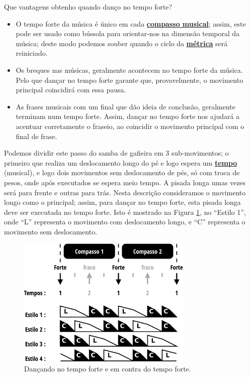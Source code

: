 \begin{tcbinformation}{Que vantagens obtenho quando danço no tempo forte?}
\label{ref:beneficiosdancarforte}
\begin{itemize}
\item O tempo forte da música é único em cada \hyperref[sec:compaso]{\textbf{compasso musical}};
assim, este pode ser usado como bússola para orientar-nos na dimensão temporal da música; deste modo
podemos souber quando o ciclo da \hyperref[def:Metrica]{\textbf{métrica}} será reiniciado.
\item Os breques nas músicas, geralmente acontecem no tempo forte da música.
Pelo que dançar no tempo forte garante que, provavelmente, 
o movimento principal coincidirá com essa pausa.
\item As frases musicais com um final que dão ideia de conclusão,
geralmente terminam num tempo forte.
Assim, dançar no tempo forte nos ajudará a acentuar corretamente o fraseio,
ao coincidir o movimento principal com o final de frase. 
\end{itemize}
\end{tcbinformation} 

\begin{example}
\label{ex:frentetrasex}
Podemos dividir este passo do samba de gafieira em 3 sub-movimentos; 
o primeiro que realiza um deslocamento longo do pé e logo espera um \hyperref[sec:Tempo]{\textbf{tempo}} (musical),
e logo dois movimentos sem deslocamento de pés, só com troca de pesos,
 onde após executados se espera meio tempo. 
A pisada longa umas vezes será para frente e outras para trás. 
Nesta descrição consideramos o movimento longo como o principal;
assim, para dançar no tempo forte, esta pisada longa deve ser executada no tempo forte.
Isto é mostrado na Figura \ref{fig:tempovscontratempo}, no ``Estilo 1'',
onde ``L'' representa o movimento com deslocamento longo,
e ``C'' representa o movimento sem deslocamento.
\end{example}


\begin{figure}[h]
    \centering 
\includegraphics[width=0.75\textwidth]{chapters/cap-musicalidade/bailarcontratempo.eps}
    \caption{Dançando no tempo forte e em contra do tempo forte.}\label{fig:tempovscontratempo}
\end{figure}




